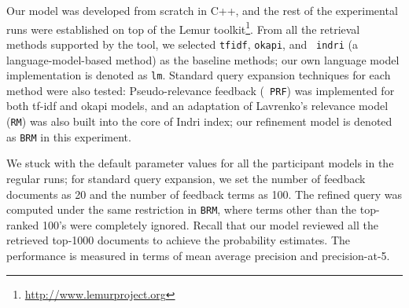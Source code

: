
Our model was developed from scratch in C++, and the rest of the experimental
runs were established on top of the Lemur
toolkit\footnote{\url{http://www.lemurproject.org}}.  From all the retrieval
methods supported by the tool, we selected {\tt tfidf}, {\tt okapi}, and {\tt
indri} (a language-model-based method) as the baseline methods; our own
language model implementation is denoted as {\tt lm}.  Standard query expansion
techniques for each method were also tested: Pseudo-relevance feedback ({\tt
PRF}) was implemented for both tf-idf and okapi models, and an adaptation of
Lavrenko's relevance model ({\tt RM}) was also built into the core of Indri
index; our refinement model is denoted as {\tt BRM} in this experiment.  

We stuck with the default parameter values {for} all the participant models in
the regular runs; for standard query expansion, we set the number of feedback
documents as 20 and the number of feedback terms as 100.  The refined query was
computed under the same restriction in {\tt BRM}, where terms other than the
top-ranked 100's were completely ignored.  Recall that our model reviewed all
the retrieved top-1000 documents to achieve the probability estimates.  The
performance is measured in terms of mean average precision and precision-at-5.  

